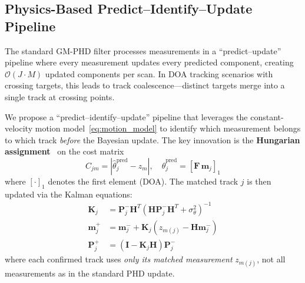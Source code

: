 \documentclass[journal]{IEEEtran}
\newcommand{\mat}[1]{\mathbf{#1}}
\begin{document}
\subsection{Physics-Based Predict--Identify--Update Pipeline}

The standard GM-PHD filter processes measurements in a ``predict--update'' pipeline where every measurement updates every predicted component, creating $\mathcal{O}(J \cdot M)$ updated components per scan. In DOA tracking scenarios with crossing targets, this leads to track coalescence---distinct targets merge into a single track at crossing points.

We propose a ``predict--identify--update'' pipeline that leverages the constant-velocity motion model~\eqref{eq:motion_model} to identify which measurement belongs to which track \emph{before} the Bayesian update. The key innovation is the \textbf{Hungarian assignment}~\cite{kuhn1955hungarian} on the cost matrix
\begin{equation}
C_{jm} = |\hat{\theta}_j^{\mathrm{pred}} - z_m|, \quad
\hat{\theta}_j^{\mathrm{pred}} = [\mat{F}\,\mat{m}_j]_1
\label{eq:hungarian_cost}
\end{equation}
where $[\cdot]_1$ denotes the first element (DOA). The matched track $j$ is then updated via the Kalman equations:
\begin{align}
\mat{K}_j &= \mat{P}_j^{-}\mat{H}^T(\mat{H}\mat{P}_j^{-}\mat{H}^T + \sigma_\theta^2)^{-1} \label{eq:kalman_gain}\\
\mat{m}_j^{+} &= \mat{m}_j^{-} + \mat{K}_j(z_{m(j)} - \mat{H}\mat{m}_j^{-}) \label{eq:kalman_state}\\
\mat{P}_j^{+} &= (\mat{I} - \mat{K}_j\mat{H})\mat{P}_j^{-} \label{eq:kalman_cov}
\end{align}
where each confirmed track uses \emph{only its matched measurement} $z_{m(j)}$, not all measurements as in the standard PHD update.
\end{document}
